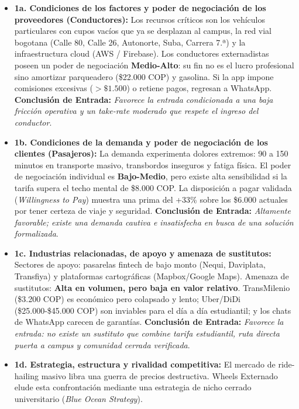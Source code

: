 \documentclass[11pt,a4paper]{article}
\begin{document}
\begin{itemize}[leftmargin=*]
    \item \textbf{1a. Condiciones de los factores y poder de negociaci\'on de los proveedores (Conductores):}  
    Los recursos cr\'iticos son los veh\'iculos particulares con cupos vac\'ios que ya se desplazan al campus, la red vial bogotana (Calle 80, Calle 26, Autonorte, Suba, Carrera 7.ª) y la infraestructura cloud (AWS / Firebase). Los conductores externadistas poseen un poder de negociaci\'on \textbf{Medio-Alto}: su fin no es el lucro profesional sino amortizar parqueadero (\$22.000 COP) y gasolina. Si la app impone comisiones excesivas ($>\$1.500$) o retiene pagos, regresan a WhatsApp.  
    \textbf{Conclusi\'on de Entrada:} \textit{Favorece la entrada condicionada a una baja fricci\'on operativa y un take-rate moderado que respete el ingreso del conductor}.

    \item \textbf{1b. Condiciones de la demanda y poder de negociaci\'on de los clientes (Pasajeros):}  
    La demanda experimenta dolores extremos: 90 a 150 minutos en transporte masivo, transbordos inseguros y fatiga f\'isica. El poder de negociaci\'on individual es \textbf{Bajo-Medio}, pero existe alta sensibilidad si la tarifa supera el techo mental de \$8.000 COP. La disposici\'on a pagar validada (\textit{Willingness to Pay}) muestra una prima del +33\% sobre los \$6.000 actuales por tener certeza de viaje y seguridad.  
    \textbf{Conclusi\'on de Entrada:} \textit{Altamente favorable; existe una demanda cautiva e insatisfecha en busca de una soluci\'on formalizada}.

    \item \textbf{1c. Industrias relacionadas, de apoyo y amenaza de sustitutos:}  
    Sectores de apoyo: pasarelas fintech de bajo monto (Nequi, Daviplata, Transfiya) y plataformas cartogr\'aficas (Mapbox/Google Maps). Amenaza de sustitutos: \textbf{Alta en volumen, pero baja en valor relativo}. TransMilenio (\$3.200 COP) es econ\'omico pero colapsado y lento; Uber/DiDi (\$25.000-\$45.000 COP) son inviables para el d\'ia a d\'ia estudiantil; y los chats de WhatsApp carecen de garant\'ias.  
    \textbf{Conclusi\'on de Entrada:} \textit{Favorece la entrada: no existe un sustituto que combine tarifa estudiantil, ruta directa puerta a campus y comunidad cerrada verificada}.

    \item \textbf{1d. Estrategia, estructura y rivalidad competitiva:}  
    El mercado de ride-hailing masivo libra una guerra de precios destructiva. Wheels Externado elude esta confrontaci\'on mediante una estrategia de nicho cerrado universitario (\textit{Blue Ocean Strategy}).
\end{itemize}
\end{document}
